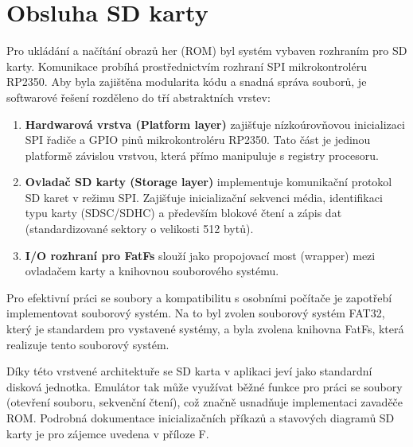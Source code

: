 \section{Obsluha SD karty}

Pro ukládání a načítání obrazů her (ROM) byl systém vybaven rozhraním pro SD karty. Komunikace
probíhá prostřednictvím rozhraní SPI mikrokontroléru RP2350. Aby byla zajištěna modularita kódu a
snadná správa souborů, je softwarové řešení rozděleno do tří abstraktních vrstev:

\begin{enumerate}
    \item \textbf{Hardwarová vrstva (Platform layer)} zajišťuje nízkoúrovňovou inicializaci SPI
        řadiče a GPIO pinů mikrokontroléru RP2350. Tato část je jedinou platformě závislou vrstvou,
        která přímo manipuluje s registry procesoru.
    \item \textbf{Ovladač SD karty (Storage layer)} implementuje komunikační protokol SD karet v
        režimu SPI. Zajišťuje inicializační sekvenci média, identifikaci typu karty (SDSC/SDHC) a
        především blokové čtení a zápis dat (standardizované sektory o velikosti 512 bytů).
    \item \textbf{I/O rozhraní pro FatFs} slouží jako propojovací most (wrapper) mezi ovladačem
        karty a knihovnou souborového systému.
\end{enumerate}

Pro efektivní práci se soubory a kompatibilitu s osobními počítače je zapotřebí implementovat
souborový systém. Na to byl zvolen souborový systém FAT32, který je standardem pro vystavené
systémy, a byla zvolena knihovna FatFs, která realizuje tento souborový systém.

Díky této vrstvené architektuře se SD karta v aplikaci jeví jako standardní disková jednotka.
Emulátor tak může využívat běžné funkce pro práci se soubory (otevření souboru, sekvenční čtení),
což značně usnadňuje implementaci zavaděče ROM. Podrobná dokumentace inicializačních příkazů a
stavových diagramů SD karty je pro zájemce uvedena v příloze F.


